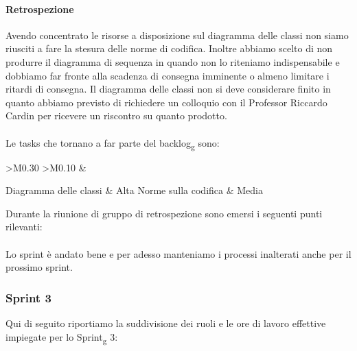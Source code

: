 \paragraph{Retrospezione}
Avendo concentrato le risorse a disposizione sul diagramma delle classi non siamo riusciti a fare la stesura delle norme di codifica.
Inoltre abbiamo scelto di non produrre il diagramma di sequenza in quando non lo riteniamo indispensabile e dobbiamo far fronte
alla scadenza di consegna imminente o almeno limitare i ritardi di consegna.
Il diagramma delle classi non si deve considerare finito in quanto abbiamo previsto di richiedere un colloquio con il Professor Riccardo Cardin per
ricevere un riscontro su quanto prodotto.
\\\\
Le tasks che tornano a far parte del backlog\textsubscript{g} sono:

\begin{longtable}{ 
	>{\centering}M{0.30\textwidth} 
	>{\centering}M{0.10\textwidth}
	}
	\rowcolorhead
	\centering 
	 &	
	\endfirsthead	
	\endhead
	
	Diagramma delle classi & Alta \tabularnewline
	Norme sulla codifica & Media \tabularnewline
	\captionline\caption{Tasks dello Sprint\textsubscript{g} 2 che ritornano a far parte del backlog\textsubscript{g}}
\end{longtable}

\noindent Durante la riunione di gruppo di retrospezione sono emersi i seguenti punti rilevanti:
\\\\
Lo sprint è andato bene e per adesso manteniamo i processi inalterati anche per il prossimo sprint.

\subsubsection{Sprint 3}
Qui di seguito riportiamo la suddivisione dei ruoli e le ore di lavoro effettive impiegate per lo Sprint\textsubscript{g} 3:

